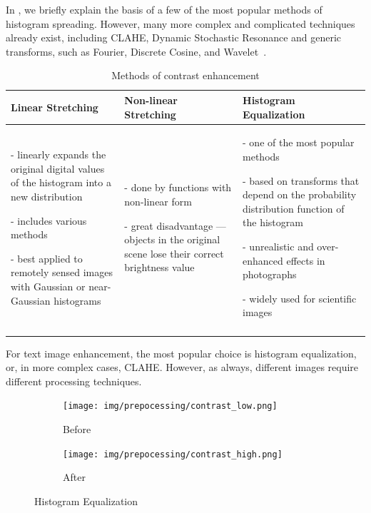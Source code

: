 In , we briefly explain the basis of a few of the most popular methods of histogram spreading. However, many more complex and complicated techniques already exist, including CLAHE, Dynamic Stochastic Resonance and generic transforms, such as Fourier, Discrete Cosine, and Wavelet~\cite{contrastOther}.

\begin{longtable}{p{10em}p{10em}p{10em}}
\textbf{Linear Stretching} & \textbf{Non-linear Stretching} & 
\textbf{Histogram Equalization}\\
\midrule

- linearly expands the original digital values of the histogram into a new distribution

- includes various methods \citep{linearNonStretch}

- best applied to remotely sensed images with Gaussian or near-Gaussian histograms

&

- done by functions with non-linear form \citep{linearNonStretch}

- great disadvantage --- objects in the original scene lose their correct brightness value

&

- one of the most popular methods \citep{histogramEQ}

- based on transforms that depend on the probability distribution function of the histogram

- unrealistic and over-enhanced effects in photographs

- widely used for scientific images
\\
\bottomrule
\caption{Methods of contrast enhancement}
\end{longtable}

For text image enhancement, the most popular choice is histogram equalization, or, in more complex cases, CLAHE. However, as always, different images require different processing techniques.

\begin{figure}[H]
\centering
\hspace*{\fill} %
\begin{subfigure}{0.31\textwidth}
\texttt{[image: img/prepocessing/contrast\_low.png]}
\caption{Before} \label{fig:1a}
\end{subfigure}
\hspace*{\fill} %
\begin{subfigure}{0.31\textwidth}
\texttt{[image: img/prepocessing/contrast\_high.png]}
\caption{After}
\end{subfigure}
\caption{Histogram Equalization}
\end{figure}


